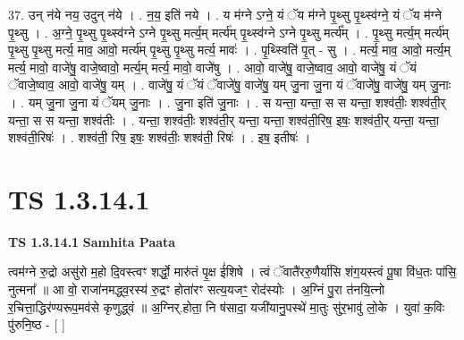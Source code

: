 \documentclass[17pt]{extarticle}
\begin{document}
37. उन् न॑ये नय॒ उदुन् न॑ये । . न॒य॒ इति॑ नये । . य म॑ग्ने ऽग्ने॒ यं ॅय म॑ग्ने पृ॒थ्सु पृ॒थ्स्व॑ग्ने॒ यं ॅय म॑ग्ने पृ॒थ्सु । . अ॒ग्ने॒ पृ॒थ्सु पृ॒थ्स्व॑ग्ने ऽग्ने पृ॒थ्सु मर्त्य॒म् मर्त्य॑म् पृ॒थ्स्व॑ग्ने ऽग्ने पृ॒थ्सु मर्त्य᳚म् । . पृ॒थ्सु मर्त्य॒म् मर्त्य॑म् पृ॒थ्सु पृ॒थ्सु मर्त्य॒ माव॒ आवो॒ मर्त्य॑म् पृ॒थ्सु पृ॒थ्सु मर्त्य॒ मावः॑ । . पृ॒थ्स्विति॑ पृ॒त् - सु । . मर्त्य॒ माव॒ आवो॒ मर्त्य॒म् मर्त्य॒ मावो॒ वाजे॑षु॒ वाजे॒ष्वावो॒ मर्त्य॒म् मर्त्य॒ मावो॒ वाजे॑षु । . आवो॒ वाजे॑षु॒ वाजे॒ष्वाव॒ आवो॒ वाजे॑षु॒ यं ॅयं ॅवाजे॒ष्वाव॒ आवो॒ वाजे॑षु॒ यम् । . वाजे॑षु॒ यं ॅयं ॅवाजे॑षु॒ वाजे॑षु॒ यम् जु॒ना जु॒ना यं ॅवाजे॑षु॒ वाजे॑षु॒ यम् जु॒नाः । . यम् जु॒ना जु॒ना यं ॅयम् जु॒नाः । . जु॒ना इति॑ जु॒नाः । . स यन्ता॒ यन्ता॒ स स यन्ता॒ शश्व॑तीः॒ शश्व॑ती॒र् यन्ता॒ स स यन्ता॒ शश्व॑तीः । . यन्ता॒ शश्व॑तीः॒ शश्व॑ती॒र् यन्ता॒ यन्ता॒ शश्व॑ती॒रिष॒ इषः॒ शश्व॑ती॒र् यन्ता॒ यन्ता॒ शश्व॑ती॒रिषः॑ । . शश्व॑ती॒ रिष॒ इषः॒ शश्व॑तीः॒ शश्व॑ती॒ रिषः॑ । . इष॒ इतीषः॑ । \newline
\pagebreak
{}
\section*{ TS 1.3.14.1 }

\textbf{TS 1.3.14.1 } \newline
\textbf{Samhita Paata} \newline

त्वम॑ग्ने रु॒द्रो असु॑रो म॒हो दि॒वस्त्वꣳ शर्द्धो॒ मारु॑तं पृ॒क्ष ई॑शिषे । त्वं ॅवातै॑ररु॒णैर्या॑सि शंग॒यस्त्वं पू॒षा वि॑ध॒तः पा॑सि॒ नुत्मना᳚ ॥ आ वो॒ राजा॑नमद्ध्व॒रस्य॑ रु॒द्रꣳ होता॑रꣳ सत्य॒यजꣳ॒॒ रोद॑स्योः । अ॒ग्निं पु॒रा त॑नयि॒त्नो र॒चित्ता॒द्धिर॑ण्यरूप॒मव॑से कृणुद्ध्वं ॥ अ॒ग्निर्.होता॒ नि ष॑सादा॒ यजी॑यानु॒पस्थे॑ मा॒तुः सु॑र॒भावु॑ लो॒के । युवा॑ क॒विः पु॑रुनि॒ष्ठ - [ ] \newline
\end{document}
